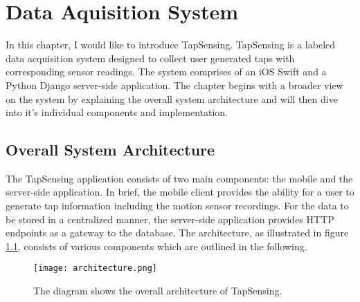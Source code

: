 \chapter{Data Aquisition System\label{cha:chapter3}}
In this chapter, I would like to introduce TapSensing. TapSensing is a labeled data acquisition system designed to collect user generated taps with corresponding sensor readings. The system comprises of an iOS Swift and a Python Django server-side application. The chapter begins with a broader view on the system by explaining the overall system architecture and will then dive into it's individual components and implementation.

\section{Overall System Architecture}

The TapSensing application consists of two main components: the mobile and the server-side application. In brief, the mobile client provides the ability for a user to generate tap information including the motion sensor recordings. For the data to be stored in a centralized manner, the server-side application provides HTTP endpoints as a gateway to the database. The architecture, as illustrated in figure \ref{fig:architecture}, consists of various components which are outlined in the following. \\

\begin{figure}[h!]
  \centering
  \texttt{[image: architecture.png]}
  \caption{The diagram shows the overall architecture of TapSensing.} \label{fig:architecture}
\end{figure}

